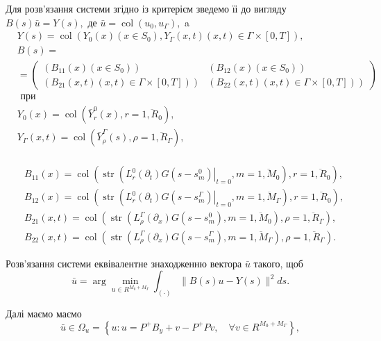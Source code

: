 Для розв'язання системи згідно із критерієм зведемо їі до вигляду
$
B(s) \bar{u}=Y(s),
$
де
$
\bar{u}=\operatorname{col}\left(u_0, u_{\Gamma}\right),
$
a
$$
\begin{aligned}
& Y(s)=\operatorname{col}\left(Y_0(x)\left(x \in S_0\right), Y_{\Gamma}(x, t)(x, t) \in \Gamma \times[0, T]\right), \\
& B(s)= \\
& =\left(\begin{array}{cc}
\left(B_{11}(x)\left(x \in S_0\right)\right) & \left(B_{12}(x)\left(x \in S_0\right)\right) \\
\left.\left(B_{21}(x, t)(x, t) \in \Gamma \times[0, T]\right)\right) & \left.\left(B_{22}(x, t)(x, t) \in \Gamma \times[0, T]\right)\right)
\end{array}\right) \\
& \text { при } \\
& Y_0(x)=\operatorname{col}\left(\bar{Y}_r^0(x), r=\overline{1, R_0}\right), \\
& Y_{\Gamma}(x, t)=\operatorname{col}\left(\bar{Y}_\rho^{\Gamma}(s), \rho=\overline{1, R_{\Gamma}}\right), \\
&
\end{aligned}
$$

$$
\begin{aligned}
& B_{11}(x)=\operatorname{col}\left(\operatorname{str}\left(\left.L_r^0\left(\partial_t\right) G\left(s-s_m^0\right)\right|_{t=0}, m=\overline{1, M_0}\right), r=\overline{1, R_0}\right), \\
& B_{12}(x)=\operatorname{col}\left(\operatorname{str}\left(\left.L_r^0\left(\partial_t\right) G\left(s-s_m^{\Gamma}\right)\right|_{t=0}, m=\overline{1, M_{\Gamma}}\right), r=\overline{1, R_0}\right), \\
& B_{21}(x, t)=\operatorname{col}\left(\operatorname{str}\left(L_\rho^{\Gamma}\left(\partial_x\right) G\left(s-s_m^0\right), m=\overline{1, M_0}\right), \rho=\overline{1, R_{\Gamma}}\right), \\
& B_{22}(x, t)=\operatorname{col}\left(\operatorname{str}\left(L_\rho^{\Gamma}\left(\partial_x\right) G\left(s-s_m^{\Gamma}\right), m=\overline{1, M_{\Gamma}}\right), \rho=\overline{1, R_{\Gamma}}\right) .
\end{aligned}
$$

Розв'язання системи еквівалентне знаходженню вектора $\bar{u}$ такого, щоб
$$
\bar{u}=\arg \min _{u \in R^{M_0+M_{\Gamma}}} \int_{(\cdot)}\|B(s) u-Y(s)\|^2 d s .
$$

Далі маємо маємо
$$
\bar{u} \in \Omega_u=\left\{u: u=P^{+} B_y+v-P^{+} P v, \quad \forall v \in R^{M_0+M_{\Gamma}}\right\},
$$

